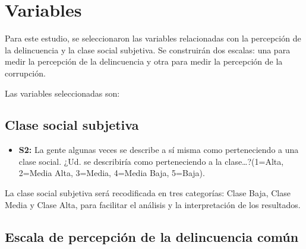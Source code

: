 \documentclass[
  spanish,
  a4paper,
  oneside]{scrbook}
\providecommand{\tightlist}{%
  \setlength{\itemsep}{0pt}\setlength{\parskip}{0pt}}
\begin{document}
\section{Variables}\label{variables}

Para este estudio, se seleccionaron las variables relacionadas con la
percepción de la delincuencia y la clase social subjetiva. Se
construirán dos escalas: una para medir la percepción de la delincuencia
y otra para medir la percepción de la corrupción.

Las variables seleccionadas son:

\subsection{Clase social subjetiva}\label{clase-social-subjetiva}

\begin{itemize}
\tightlist
\item
  \textbf{S2:} La gente algunas veces se describe a sí misma como
  perteneciendo a una clase social. ¿Ud. se describiría como
  perteneciendo a la clase\ldots?(1=Alta, 2=Media Alta, 3=Media, 4=Media
  Baja, 5=Baja).
\end{itemize}

La clase social subjetiva será recodificada en tres categorías: Clase
Baja, Clase Media y Clase Alta, para facilitar el análisis y la
interpretación de los resultados.

\subsection{Escala de percepción de la delincuencia
común}\label{escala-de-percepciuxf3n-de-la-delincuencia-comuxfan}
\end{document}

